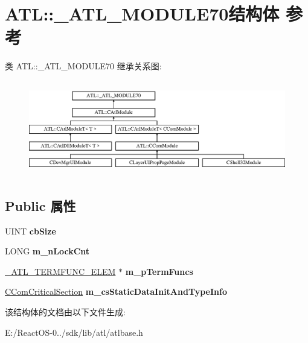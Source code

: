 \hypertarget{struct_a_t_l_1_1___a_t_l___m_o_d_u_l_e70}{}\section{A\+TL\+:\+:\+\_\+\+A\+T\+L\+\_\+\+M\+O\+D\+U\+L\+E70结构体 参考}
\label{struct_a_t_l_1_1___a_t_l___m_o_d_u_l_e70}
类 A\+TL\+:\+:\+\_\+\+A\+T\+L\+\_\+\+M\+O\+D\+U\+L\+E70 继承关系图\+:\begin{figure}[H]
\begin{center}
\leavevmode
\includegraphics[height=4.204205cm]{struct_a_t_l_1_1___a_t_l___m_o_d_u_l_e70}
\end{center}
\end{figure}
\subsection*{Public 属性}
\begin{DoxyCompactItemize}
\item 
\mbox{\label{struct_a_t_l_1_1___a_t_l___m_o_d_u_l_e70_a22e0091849cb07dc6ec9bed735b41fa8}} 
U\+I\+NT {\bfseries cb\+Size}
\item 
\mbox{\label{struct_a_t_l_1_1___a_t_l___m_o_d_u_l_e70_a49ad80154dc3490d4d5bf498df1cc03c}} 
L\+O\+NG {\bfseries m\+\_\+n\+Lock\+Cnt}
\item 
\mbox{\label{struct_a_t_l_1_1___a_t_l___m_o_d_u_l_e70_aa3976070755239c8385a746bb187dc06}} 
\hyperlink{struct_a_t_l_1_1___a_t_l___t_e_r_m_f_u_n_c___e_l_e_m}{\+\_\+\+A\+T\+L\+\_\+\+T\+E\+R\+M\+F\+U\+N\+C\+\_\+\+E\+L\+EM} $\ast$ {\bfseries m\+\_\+p\+Term\+Funcs}
\item 
\mbox{\label{struct_a_t_l_1_1___a_t_l___m_o_d_u_l_e70_a81fc53d81756bfa048202d35a0f4ea54}} 
\hyperlink{class_a_t_l_1_1_c_com_critical_section}{C\+Com\+Critical\+Section} {\bfseries m\+\_\+cs\+Static\+Data\+Init\+And\+Type\+Info}
\end{DoxyCompactItemize}


该结构体的文档由以下文件生成\+:\begin{DoxyCompactItemize}
\item 
E\+:/\+React\+O\+S-\/0../sdk/lib/atl/atlbase.\+h\end{DoxyCompactItemize}
